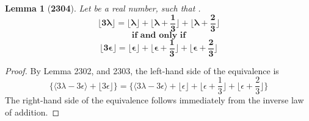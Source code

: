 \documentclass[preview]{standalone}
\newtheorem{lemma}{Lemma}
\begin{document}
\begin{lemma}[\textbf{2304}]
    Let \bm{$\lambda$} be a real number, 
    such that \bm{$\big \lfloor \lambda \big \rfloor + \epsilon = \lambda$}.
    \begin{equation*}
        \bm{
            \bigg \lfloor 3 \lambda \bigg \rfloor
                =
            \bigg \lfloor \lambda \bigg \rfloor 
                + 
            \bigg \lfloor \lambda + \frac{1}{3} \bigg \rfloor 
                + 
            \bigg \lfloor \lambda + \frac{2}{3} \bigg \rfloor
        }
    \end{equation*}
    \begin{equation*}
        \textbf{if and only if}
    \end{equation*}
    \begin{equation*}
        \bm{
            \bigg \lfloor 3 \epsilon \bigg \rfloor
                =
            \bigg \lfloor \epsilon \bigg \rfloor 
                + 
            \bigg \lfloor \epsilon + \frac{1}{3} \bigg \rfloor 
                + 
            \bigg \lfloor \epsilon + \frac{2}{3} \bigg \rfloor
        }
    \end{equation*}
\end{lemma}

\begin{proof}
    By Lemma 2302, and 2303, the left-hand side of the equivalence is
    \begin{equation*}
        \Bigg\{
            \bigg \langle 
                3 \lambda - 3 \epsilon 
            \bigg \rangle
                +
            \bigg \lfloor 3 \epsilon \bigg \rfloor
        \Bigg\}
            =
        \Bigg\{
            \bigg \langle 3 \lambda - 3 \epsilon \bigg \rangle
                + 
            \bigg \lfloor \epsilon \bigg \rfloor 
                + 
            \bigg \lfloor \epsilon + \frac{1}{3} \bigg \rfloor 
                + 
            \bigg \lfloor \epsilon + \frac{2}{3} \bigg \rfloor
        \Bigg\}
    \end{equation*}
    The right-hand side of the equivalence follows immediately 
    from the inverse law of addition.
\end{proof}
\end{document}
